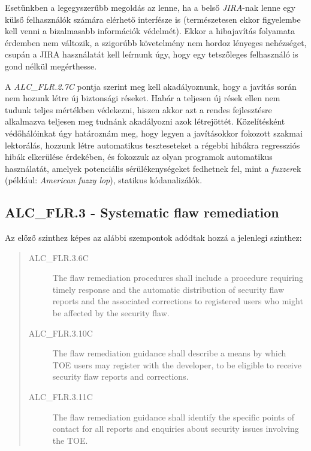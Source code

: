 Esetünkben a legegyszerűbb megoldás az lenne, ha a belső \emph{JIRA}-nak lenne egy külső
felhasználók számára elérhető interfésze is (természetesen ekkor figyelembe kell venni a bizalmasabb
információk védelmét). Ekkor a hibajavítás folyamata érdemben nem változik, a szigorúbb követelmény
nem hordoz lényeges nehézséget, csupán a JIRA használatát kell leírnunk úgy, hogy egy tetszőleges
felhasználó is gond nélkül megérthesse.

A \emph{ALC\_FLR.2.7C} pontja szerint meg kell akadályoznunk, hogy a javítás során nem hozunk létre
új biztonsági réseket. Habár a teljesen új rések ellen nem tudunk teljes mértékben védekezni, hiszen
akkor azt a rendes fejlesztésre alkalmazva teljesen meg tudnánk akadályozni azok létrejöttét.
Közelítésként védőhálóinkat úgy határoznám meg, hogy legyen a javításokkor fokozott szakmai
lektorálás, hozzunk létre automatikus teszteseteket a régebbi hibákra regressziós hibák elkerülése
érdekében, és fokozzuk az olyan programok automatikus használatát, amelyek potenciális
sérülékenységeket fedhetnek fel, mint a \emph{fuzzer}ek (például: \emph{American fuzzy lop}),
statikus kódanalizálók.

\subsection{ALC\_FLR.3 - Systematic flaw remediation}

Az előző szinthez képes az alábbi szempontok adódtak hozzá a jelenlegi szinthez:
\begin{quote}
    \begin{description}
        \item[ALC\_FLR.3.6C]{The flaw remediation procedures shall include a procedure requiring
            timely response and the automatic distribution of security flaw reports and the
            associated corrections to registered users who might be affected by the security flaw.}
        \item[ALC\_FLR.3.10C]{The flaw remediation guidance shall describe a means by which TOE
            users may register with the developer, to be eligible to receive security flaw reports
            and corrections.}
        \item[ALC\_FLR.3.11C]{The flaw remediation guidance shall identify the specific points of
            contact for all reports and enquiries about security issues involving the TOE.}
    \end{description}
\end{quote}

